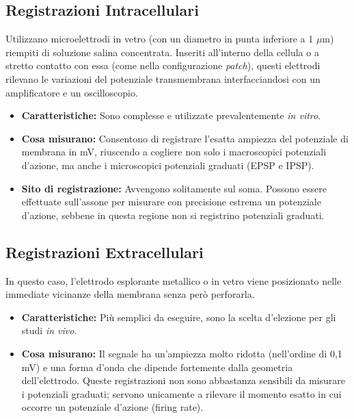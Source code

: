 \subsection{Registrazioni Intracellulari}
Utilizzano microelettrodi in vetro (con un diametro in punta inferiore a 1 $\mu$m) riempiti di soluzione salina concentrata. Inseriti all'interno della cellula o a stretto contatto con essa (come nella configurazione \textit{patch}), questi elettrodi rilevano le variazioni del potenziale transmembrana interfacciandosi con un amplificatore e un oscilloscopio.
\begin{itemize}
    \item \textbf{Caratteristiche:} Sono complesse e utilizzate prevalentemente \textit{in vitro}.
    \item \textbf{Cosa misurano:} Consentono di registrare l'esatta ampiezza del potenziale di membrana in mV, riuscendo a cogliere non solo i macroscopici potenziali d'azione, ma anche i microscopici potenziali graduati (EPSP e IPSP).
    \item \textbf{Sito di registrazione:} Avvengono solitamente sul soma. Possono essere effettuate sull'assone per misurare con precisione estrema un potenziale d'azione, sebbene in questa regione non si registrino potenziali graduati.
\end{itemize}

\subsection{Registrazioni Extracellulari}
In questo caso, l'elettrodo esplorante metallico o in vetro viene posizionato nelle immediate vicinanze della membrana senza però perforarla.
\begin{itemize}
    \item \textbf{Caratteristiche:} Più semplici da eseguire, sono la scelta d'elezione per gli studi \textit{in vivo}.
    \item \textbf{Cosa misurano:} Il segnale ha un'ampiezza molto ridotta (nell'ordine di 0,1 mV) e una forma d'onda che dipende fortemente dalla geometria dell'elettrodo. Queste registrazioni non sono abbastanza sensibili da misurare i potenziali graduati; servono unicamente a rilevare il momento esatto in cui occorre un potenziale d'azione (firing rate).
\end{itemize}

